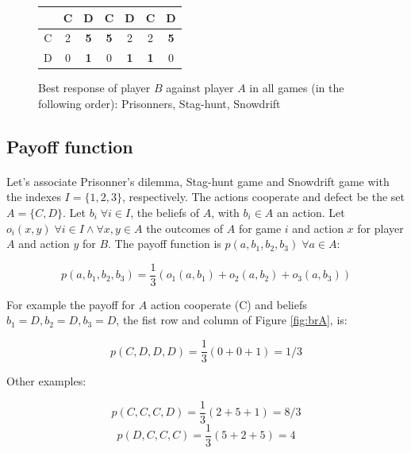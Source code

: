 \documentclass[letterpaper]{article}
\begin{document}
\begin{figure}[!ht]

\begin{center}
\begin{tabular}{|c|c|c||c|c||c|c|}
    \hline
    & C & D & C & D & C & D \\
    \hline
    C & 2 & \textbf{5} & \textbf{5}
    & 2 & 2 & \textbf{5} \\
    \hline
    D & 0 & \textbf{1} & 0 & \textbf{1}
    & \textbf{1} & 0 \\
    \hline
\end{tabular}
\end{center}

\caption{Best response of player $B$ against player $A$ in all games
 (in the following order): Prisonners, Stag-hunt, Snowdrift}
\label{fig:brB}
\end{figure}


\subsection{Payoff function}

\paragraph{}

Let's associate Prisonner's dilemma, Stag-hunt game and Snowdrift game with
the indexes $I = \{1, 2, 3\}$, respectively. The actions
cooperate and defect be the set $A = \{C, D\}$. Let $b_i \; \forall i \in I$,
the beliefs of $A$, with $b_i \in A$ an action.
Let $o_i(x, y) \; \forall i \in I \wedge
\forall x,y \in A$ the outcomes of $A$ for game $i$ and action $x$ for
player $A$ and action $y$ for $B$. The
payoff function is $p(a, b_1, b_2, b_3) \; \forall a \in A$:

\begin{equation}
 p(a, b_1, b_2, b_3) = \frac{1}{3}(o_1(a, b_1)+o_2(a, b_2)+o_3(a, b_3))
\end{equation}

For example the payoff for $A$ action cooperate (C) and beliefs
$b_1 = D, b_2 = D, b_3 = D$, the fist row and column of Figure \ref{fig:brA},
is:

\begin{equation}
    p(C, D, D, D) = \frac{1}{3}(0 + 0 + 1) = 1/3
\end{equation}

Other examples:

\begin{equation}
    p(C, C, C, D) = \frac{1}{3}(2 + 5 + 1) = 8/3
\end{equation}
\begin{equation}
    p(D, C, C, C) = \frac{1}{3}(5 + 2 + 5) = 4
\end{equation}
\end{document}
